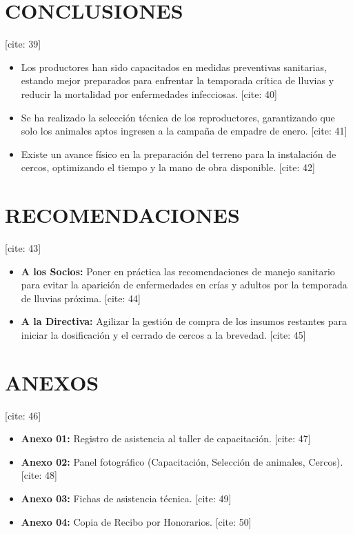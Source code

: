 \documentclass[11pt,a4paper]{article}
\begin{document}
\section{CONCLUSIONES} [cite: 39]
\begin{itemize}
    \item Los productores han sido capacitados en medidas preventivas sanitarias, estando mejor preparados para enfrentar la temporada crítica de lluvias y reducir la mortalidad por enfermedades infecciosas. [cite: 40]
    \item Se ha realizado la selección técnica de los reproductores, garantizando que solo los animales aptos ingresen a la campaña de empadre de enero. [cite: 41]
    \item Existe un avance físico en la preparación del terreno para la instalación de cercos, optimizando el tiempo y la mano de obra disponible. [cite: 42]
\end{itemize}

\section{RECOMENDACIONES} [cite: 43]
\begin{itemize}
    \item \textbf{A los Socios:} Poner en práctica las recomendaciones de manejo sanitario para evitar la aparición de enfermedades en crías y adultos por la temporada de lluvias próxima. [cite: 44]
    \item \textbf{A la Directiva:} Agilizar la gestión de compra de los insumos restantes para iniciar la dosificación y el cerrado de cercos a la brevedad. [cite: 45]
\end{itemize}

\section{ANEXOS} [cite: 46]
\begin{itemize}
    \item \textbf{Anexo 01:} Registro de asistencia al taller de capacitación. [cite: 47]
    \item \textbf{Anexo 02:} Panel fotográfico (Capacitación, Selección de animales, Cercos). [cite: 48]
    \item \textbf{Anexo 03:} Fichas de asistencia técnica. [cite: 49]
    \item \textbf{Anexo 04:} Copia de Recibo por Honorarios. [cite: 50]
\end{itemize}
\end{document}
